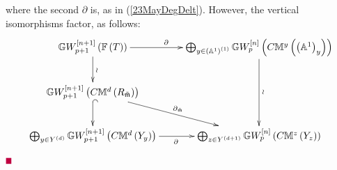 \documentclass[12pt]{article}
\begin{document}
where the second $\partial$ is, as in (\ref{23MayDegDelt}). However, the vertical isomorphisms factor, as follows:
$$%
\diagram 
{\BG}W_{p+1}^{\LRt{n+1}}\LRf{{\BF}\LRf{T}}\ar[r]^{\partial\qquad}\ar[d]^{\wr} &
\bigoplus_{y\in \LRf{{\BA}^1}^{\LRf{1}}} {\BG}W_{p}^{\LRt{n}}\LRf{C{\BM}^y\LRf{\LRf{{\BA}^1}_y}}   \ar[dd]^{\wr}\\
{\BG}W_{p+1}^{\LRt{n+1}}\LRf{C{\BM}^d\LRf{R_{\tilde{\m}}}}\ar@{^(->}[d] \ar[dr]^{\partial_{\tilde{\m}}} & \\
\bigoplus_{y\in Y^{\LRf{d}}}{\BG}W_{p+1}^{\LRt{n+1}}\LRf{C{\BM}^{d}\LRf{Y_y}}%
\ar[r]_{\partial}& \bigoplus_{z\in Y^{\LRf{d+1}}}
{\BG}W^{\LRt{n}}_p\LRf{C{\BM}^z\LRf{{Y}_z}}  \\
\enddiagram 
$$ 
\pic $\eop$ 



\end{document}
